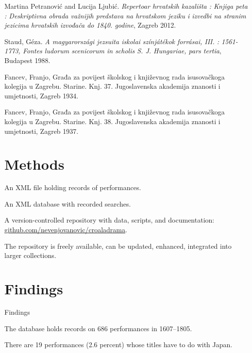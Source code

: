 \documentclass[14pt]{beamer}
\begin{document}
\begin{frame}[Bibliographiae]

Martina Petranović and Lucija Ljubić. \emph{Repertoar hrvatskih kazališta : Knjiga peta : Deskriptivna obrada važnijih predstava na hrvatskom jeziku i izvedbi na stranim jezicima hrvatskih izvođača do 1840. godine}, Zagreb 2012.

Staud, Géza. \emph{A magyarországi jezsuita iskolai színjátékok forrásai, III. : 1561-1773, Fontes ludorum scenicorum in scholis S. J. Hungariae, pars tertia}, Budapest 1988.

\end{frame}
\begin{frame}[Historiae]

Fancev, Franjo, Građa za povijest školskog i književnog rada
isusovačkoga kolegija u Zagrebu. Starine. Knj. 37. Jugoslavenska
akademija znanosti i umjetnosti, Zagreb 1934.

Fancev, Franjo, Građa za povijest školskog i književnog rada
isusovačkoga kolegija u Zagrebu. Starine. Knj. 38. Jugoslavenska
akademija znanosti i umjetnosti, Zagreb 1937.

\end{frame}

\section{Methods}

\begin{frame}

An XML file holding records of performances.

An XML database with recorded searches.

A version-controlled repository with data, scripts, and documentation: \href{https://github.com/nevenjovanovic/croaladrama}{github.com/nevenjovanovic/croaladrama}.

The repository is freely available, can be updated, enhanced, integrated into larger collections.

\end{frame}

\section{Findings}

\begin{frame}{Findings}

The database holds records on \alert{686} performances in 1607–1805.

There are \alert{19} performances (2.6 percent) whose titles have to do with Japan.

\end{frame}
\end{document}
